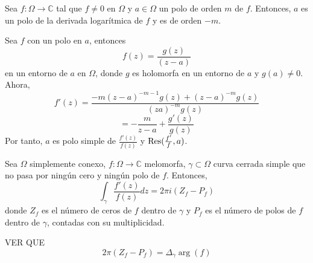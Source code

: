 \begin{prop}
  Sea $f : \Omega \to \mathbb{C}$ tal que $f \neq 0$ en $\Omega$ y $a \in \Omega$ un polo de orden $m$ de $f$. Entonces, $a$ es un polo de la derivada logarítmica de $f$ y es de orden $-m$.
\end{prop}

\begin{dem}
  Sea $f$ con un polo en $a$, entonces
  \[ 
    f(z) = \frac{g(z)}{(z - a)} 
  \] 
  en un entorno de $a$ en $\Omega$, donde $g$ es holomorfa en un entorno de $a$ y $g(a) \neq 0$. Ahora, 
  \[ 
    f'(z) = \frac{-m(z - a)^{-m-1} g(z) + (z - a)^{-m} g(z)}{(za)^{-m}g(z)} 
  \] 
  \[ 
    = - \frac{m}{z - a} + \frac{g'(z)}{g(z)}
  \] 
  Por tanto, $a$ es polo simple de $\frac{f'(z)}{f(z)}$ y $\operatorname{Res}(\frac{f'}{f}, a)$.
\end{dem}

\begin{theo}
  Sea $\Omega$ simplemente conexo, $f : \Omega \to \mathbb{C}$ melomorfa, $\gamma \subset \Omega$ curva cerrada simple que no pasa por ningún cero y ningún polo de $f$. Entonces,
  \[ 
    \int_{\gamma}^{} \frac{f'(z)}{f(z)} dz = 2 \pi i  (Z_{f} - P_{f})
  \]
  donde $Z_{f}$ es el número de ceros de $f$ dentro de $\gamma$ y $P_{f}$ es el número de polos de $f$ dentro de $\gamma$, contadas con su multiplicidad.
\end{theo}

\begin{note}
  VER QUE
  \[
    2 \pi (Z_{f} - P_{f}) = \Delta_{\gamma} \arg(f)
  \]
\end{note}
